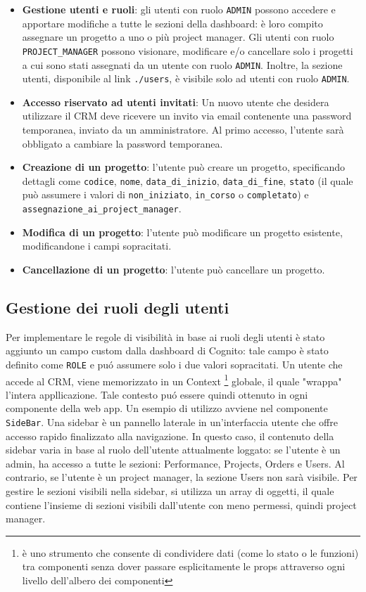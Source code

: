 \documentclass[target=bach,aauheader=,style=]{thud}
\begin{document}
\begin{itemize}
    \item \textbf{Gestione utenti e ruoli}: gli utenti con ruolo \texttt{ADMIN} possono accedere e apportare modifiche a tutte le sezioni della dashboard: è loro compito assegnare un progetto a uno o più project manager. Gli utenti con ruolo \texttt{PROJECT\_MANAGER} possono visionare, modificare e/o cancellare solo i progetti a cui sono stati assegnati da un utente con ruolo \texttt{ADMIN}. Inoltre, la sezione utenti, disponibile al link \texttt{./users}, è visibile solo ad utenti con ruolo \texttt{ADMIN}.
    \item \textbf{Accesso riservato ad utenti invitati}: Un nuovo utente che desidera utilizzare il CRM deve ricevere un invito via email contenente una password temporanea, inviato da un amministratore. Al primo accesso, l'utente sarà obbligato a cambiare la password temporanea.
    \item \textbf{Creazione di un progetto}: l'utente può creare un progetto, specificando dettagli come \texttt{codice}, \texttt{nome}, \texttt{data\_di\_inizio}, \texttt{data\_di\_fine}, \texttt{stato} (il quale può assumere i valori di \texttt{non\_iniziato}, \texttt{in\_corso} o \texttt{completato}) e \texttt{assegnazione\_ai\_project\_manager}.
    \item \textbf{Modifica di un progetto}: l'utente può modificare un progetto esistente, modificandone i campi sopracitati.
    \item \textbf{Cancellazione di un progetto}: l'utente può cancellare un progetto. 
\end{itemize}

\subsection{Gestione dei ruoli degli utenti}
Per implementare le regole di visibilità in base ai ruoli degli utenti è stato aggiunto un campo custom dalla dashboard di Cognito: tale campo è stato definito come \texttt{ROLE} e puó assumere solo i due valori sopracitati. Un utente che accede al CRM, viene memorizzato in un Context \footnote{è uno strumento che consente di condividere dati (come lo stato o le funzioni) tra componenti senza dover passare esplicitamente le props attraverso ogni livello dell'albero dei componenti} globale, il quale "wrappa" l'intera appllicazione. Tale contesto puó essere quindi ottenuto in ogni componente della web app. Un esempio di utilizzo avviene nel componente \texttt{SideBar}. Una sidebar è un pannello laterale in un'interfaccia utente che offre accesso rapido finalizzato alla navigazione. In questo caso, il contenuto della sidebar varia in base al ruolo dell'utente attualmente loggato: se l'utente è un admin, ha accesso a tutte le sezioni: Performance, Projects, Orders e Users. Al contrario, se l'utente è un project manager, la sezione Users non sarà visibile. Per gestire le sezioni visibili nella sidebar, si utilizza un array di oggetti, il quale contiene l'insieme di sezioni visibili dall'utente con meno permessi, quindi project manager. 
\end{document}
